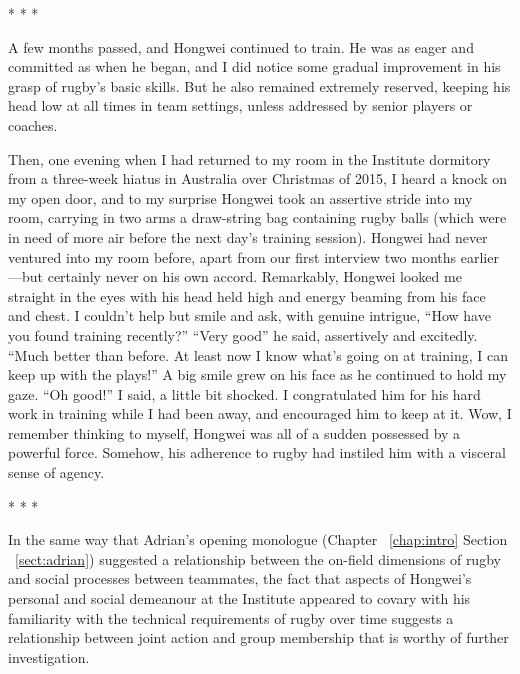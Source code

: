 \begin{CJK}{UTF8}{gbsn}
                            \begin{center}
                              * * *
                            \end{center}

A few months passed, and Hongwei continued to train.  He was as eager and committed as when he began, and I did notice some gradual improvement in his grasp of rugby's basic skills.  But he also remained extremely reserved, keeping his head low at all times in team settings, unless addressed by senior players or coaches.

Then, one evening when I had returned to my room in the Institute dormitory from a three-week hiatus in Australia over Christmas of 2015, I heard a knock on my open door, and to my surprise Hongwei took an assertive stride into my room, carrying in two arms a draw-string bag containing rugby balls (which were in need of more air before the next day's training session).  Hongwei had never ventured into my room before, apart from our first interview two months earlier---but certainly never on his own accord.  Remarkably, Hongwei looked me straight in the eyes with his head held high and energy beaming from his face and chest.  I couldn't help but smile and ask, with genuine intrigue, ``How have you found training recently?''
``Very good'' he said, assertively and excitedly.  ``Much better than before.  At least now I know what’s going on at training, I can keep up with the plays!''  A big smile grew on his face as he continued to hold my gaze.  ``Oh good!'' I said, a little bit shocked.  I congratulated him for his hard work in training while I had been away, and encouraged him to keep at it.  Wow, I remember thinking to myself, Hongwei was all of a sudden possessed by a powerful force.  Somehow, his adherence to rugby had instiled him with a visceral sense of agency.

                          \begin{center}
                            * * *
                          \end{center}

In the same way that Adrian's opening monologue (Chapter ~\ref{chap:intro} Section ~\ref{sect:adrian}) suggested a relationship between the on-field dimensions of rugby and social processes between teammates, the fact that aspects of Hongwei's personal and social demeanour at the Institute appeared to covary with his familiarity with the technical requirements of rugby over time suggests a relationship between joint action and group membership that is worthy of further investigation.


\end{CJK}

